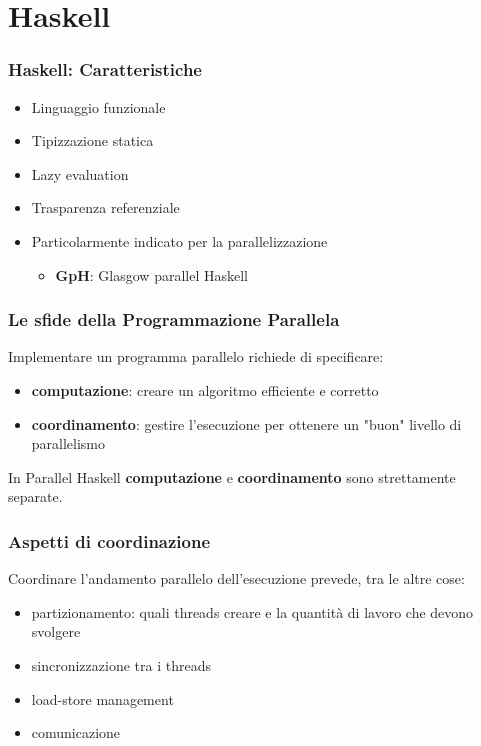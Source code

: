 \documentclass[14pt]{beamer}
\begin{document}
\section{Haskell}
\begin{frame}
\frametitle{Haskell: Caratteristiche} 
\begin{itemize}
\item Linguaggio funzionale
\item Tipizzazione statica
\item Lazy evaluation
\item Trasparenza referenziale
 \item Particolarmente indicato per la parallelizzazione
  \begin{itemize}
  \item \textbf{GpH}: Glasgow parallel Haskell
  \end{itemize}

\end{itemize}
\end{frame}


\begin{frame}
\frametitle{Le sfide della Programmazione Parallela}
Implementare un programma parallelo richiede di specificare:
\begin{itemize}
\item \textbf{computazione}: creare un algoritmo  efficiente e corretto
\item \textbf{coordinamento}: gestire l'esecuzione per ottenere un "buon" livello di parallelismo
\end{itemize}
In Parallel Haskell \textbf{computazione} e \textbf{coordinamento} sono strettamente separate.
\end{frame}

\begin{frame}
\frametitle{Aspetti di coordinazione}
Coordinare l'andamento parallelo dell'esecuzione prevede, tra le altre cose:
\begin{itemize}
\item partizionamento: quali threads creare e la quantità di lavoro che devono svolgere
\item sincronizzazione tra i threads
\item load-store management
\item comunicazione 
\end{itemize}
\end{frame}
\end{document}
